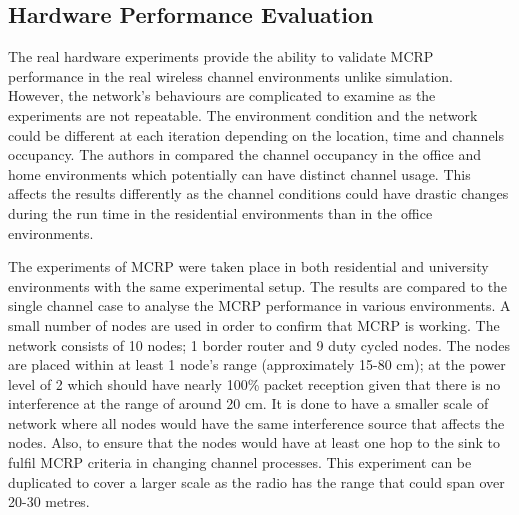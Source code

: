 \subsection{Hardware Performance Evaluation}


The real hardware experiments provide the ability to validate MCRP performance in the real wireless channel environments unlike simulation. However, the network's behaviours are complicated to examine as the experiments are not repeatable. The environment condition and the network could be different at each iteration depending on the location, time and channels occupancy. The authors in \cite{homearea} compared the channel occupancy in the office and home environments which potentially can have distinct channel usage. This affects the results differently as the channel conditions could have drastic changes during the run time in the residential environments than in the office environments.

The experiments of MCRP were taken place in both residential and university environments with the same experimental setup.
The results are compared to the single channel case to analyse the MCRP performance in various environments.
A small number of nodes are used in order to confirm that MCRP is working. 
The network consists of 10 nodes; 1 border router and 9 duty cycled nodes. The nodes are placed within at least 1 node's range (approximately 15-80 cm); at the power level of 2 which should have nearly 100\% packet reception given that there is no interference at the range of around 20 cm. 
It is done to have a smaller scale of network where all nodes would have the same interference source that affects the nodes. Also, to ensure that the nodes would have at least one hop to the sink to fulfil MCRP criteria in changing channel processes. This experiment can be duplicated to cover a larger scale as the radio has the range that could span over 20-30 metres. 

